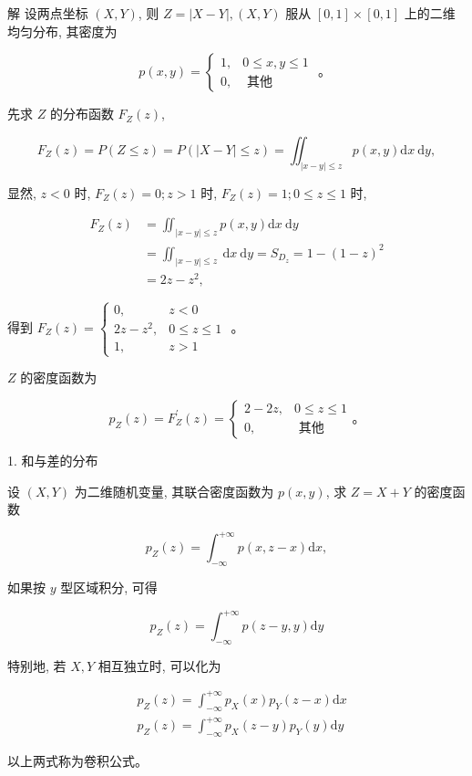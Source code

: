 \documentclass{beamer}
\begin{document}
	\begin{frame}
		解 设两点坐标 $(X, Y)$, 则 $Z=|X-Y|,(X, Y)$ 服从 $[0,1] \times[0,1]$ 上的二维均匀分布, 其密度为
		
		$$
		p(x, y)=\left\{\begin{array}{cc}
			1, & 0 \leqslant x, y \leqslant 1 \\
			0, & \text { 其他 }
		\end{array}\right. \text { 。 }
		$$
		
		先求 $Z$ 的分布函数 $F_{Z}(z)$,
		
		$$
		F_{Z}(z)=P(Z \leqslant z)=P(|X-Y| \leqslant z)=\iint_{|x-y| \leqslant z} p(x, y) \mathrm{d} x \mathrm{~d} y,
		$$
		
		显然, $z<0$ 时, $F_{Z}(z)=0 ; z>1$ 时, $F_{Z}(z)=1 ; 0 \leqslant z \leqslant 1$ 时,
		
		$$
		\begin{aligned}
			F_{Z}(z) & =\iint_{|x-y| \leqslant z} p(x, y) \mathrm{d} x \mathrm{~d} y \\
			& =\iint_{|x-y| \leqslant z} \mathrm{~d} x \mathrm{~d} y=S_{D_{z}}=1-(1-z)^{2} \\
			& =2 z-z^{2},
		\end{aligned}
		$$
	\end{frame}
	
	\begin{frame}
		得到 $F_{Z}(z)=\left\{\begin{array}{cc}0, & z<0 \\ 2 z-z^{2}, & 0 \leqslant z \leqslant 1 \\ 1, & z>1\end{array}\right.$ 。
		
		$Z$ 的密度函数为
		
		$$
		p_{Z}(z)=F_{Z}^{\prime}(z)=\left\{\begin{array}{cc}
			2-2 z, & 0 \leqslant z \leqslant 1 \\
			0, & \text { 其他 }
		\end{array} 。\right.
		$$
	\end{frame}
	
	\begin{frame}
		1. 和与差的分布
		
		设 $(X, Y)$ 为二维随机变量, 其联合密度函数为 $p(x, y)$, 求 $Z=X+Y$ 的密度函数
		
		 $$p_{Z}(z)=\int_{-\infty}^{+\infty} p(x, z-x) \mathrm{d} x,$$
		 
		 如果按 $y$ 型区域积分, 可得
		
		$$
		p_{Z}(z)=\int_{-\infty}^{+\infty} p(z-y, y) \mathrm{d} y
		$$
		
		特别地, 若 $X, Y$ 相互独立时, 可以化为
		
		$$
		\begin{aligned}
			& p_{Z}(z)=\int_{-\infty}^{+\infty} p_{X}(x) p_{Y}(z-x) \mathrm{d} x \\
			& p_{Z}(z)=\int_{-\infty}^{+\infty} p_{X}(z-y) p_{Y}(y) \mathrm{d} y
		\end{aligned}
		$$
		
		以上两式称为卷积公式。 
	\end{frame}
	
\end{document}
